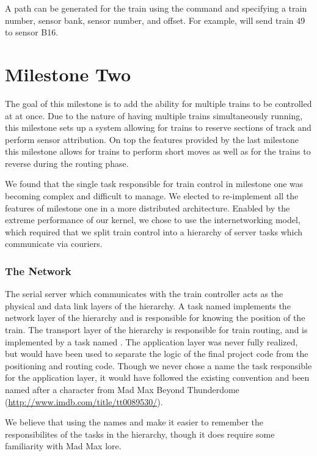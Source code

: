 \documentclass[pdftex,10pt,a4paper]{article}
\begin{document}
A path can be generated for the train using the  command and
specifying a train number, sensor bank, sensor number, and offset. For
example,  will send train 49 to sensor B16.


\part*{Milestone Two}

The goal of this milestone is to add the ability for multiple trains to be
controlled at at once. Due to the nature of having multiple trains
simultaneously running, this milestone sets up a system allowing for
trains to reserve sections of track and perform sensor attribution. On
top the features provided by the last milestone this milestone allows
for trains to perform short moves as well as for the trains to reverse
during the routing phase.

We found that the single task responsible for train control in
milestone one was becoming complex and difficult to manage. We elected
to re-implement all the features of milestone one in a more
distributed architecture.  Enabled by the extreme performance of our
kernel, we chose to use the internetworking model, which required that
we split train control into a hierarchy of server tasks which
communicate via couriers.

\section*{The Network}

The serial server which communicates with the train controller acts as the
physical and data link layers of the hierarchy. A task named
 implements the network layer of the hierarchy and is
responsible for knowing the position of the train. The transport layer
of the hierarchy is responsible for train routing, and is implemented
by a task named . The application layer was never
fully realized, but would have been used to separate the logic of the
final project code from the positioning and routing code. Though we
never chose a name the task responsible for the application layer, it
would have followed the existing convention and been named after a
character from Mad Max Beyond Thunderdome
(\url{http://www.imdb.com/title/tt0089530/}).

We believe that using the names  and
 make it easier to remember the responsibilites of
the tasks in the hierarchy, though it does require some familiarity
with Mad Max lore.
\end{document}
